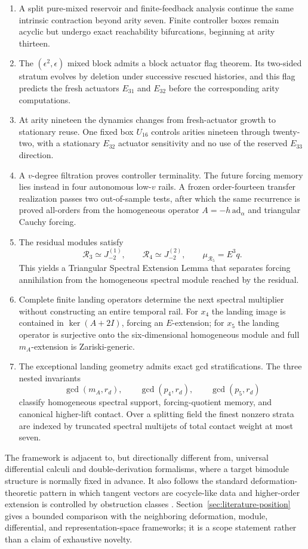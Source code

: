 \documentclass[11pt]{amsart}
\begin{document}
\begin{enumerate}[label=(\roman*)]
\item A split pure-mixed reservoir and finite-feedback analysis continue the same intrinsic contraction beyond arity seven.  Finite controller boxes remain acyclic but undergo exact reachability bifurcations, beginning at arity thirteen.
\item The $(\epsilon^2,\epsilon)$ mixed block admits a block actuator flag theorem.  Its two-sided stratum evolves by deletion under successive rescued histories, and this flag predicts the fresh actuators $E_{31}$ and $E_{32}$ before the corresponding arity computations.
\item At arity nineteen the dynamics changes from fresh-actuator growth to stationary reuse.  One fixed box $U_{16}$ controls arities nineteen through twenty-two, with a stationary $E_{32}$ actuator sensitivity and no use of the reserved $E_{33}$ direction.
\item A $v$-degree filtration proves controller terminality.  The future forcing memory lies instead in four autonomous low-$v$ rails.  A frozen order-fourteen transfer realization passes two out-of-sample tests, after which the same recurrence is proved all-orders from the homogeneous operator $A=-h\,\mathrm{ad}_\alpha$ and triangular Cauchy forcing.
\item The residual modules satisfy
\[
\mathcal R_3\simeq J_{-2}^{(1)},
\qquad
\mathcal R_4\simeq J_{-2}^{(2)},
\qquad
\mu_{\mathcal R_5}=E^3q.
\]
This yields a Triangular Spectral Extension Lemma that separates forcing annihilation from the homogeneous spectral module reached by the residual.
\item Complete finite landing operators determine the next spectral multiplier without constructing an entire temporal rail.  For $x_4$ the landing image is contained in $\ker(A+2I)$, forcing an $E$-extension; for $x_5$ the landing operator is surjective onto the six-dimensional homogeneous module and full $m_A$-extension is Zariski-generic.
\item The exceptional landing geometry admits exact gcd stratifications.  The three nested invariants
\[
\gcd(m_A,r_d),\qquad \gcd(p_4,r_d),\qquad \gcd(p_5,r_d)
\]
classify homogeneous spectral support, forcing-quotient memory, and canonical higher-lift contact.  Over a splitting field the finest nonzero strata are indexed by truncated spectral multijets of total contact weight at most seven.
\end{enumerate}

The framework is adjacent to, but directionally different from, universal differential calculi and double-derivation formalisms, where a target bimodule structure is normally fixed in advance.  It also follows the standard deformation-theoretic pattern in which tangent vectors are cocycle-like data and higher-order extension is controlled by obstruction classes \cite{Gerstenhaber1964,Schlessinger1968}.  Section~\ref{sec:literature-position} gives a bounded comparison with the neighboring deformation, module, differential, and representation-space frameworks; it is a scope statement rather than a claim of exhaustive novelty.
\end{document}

